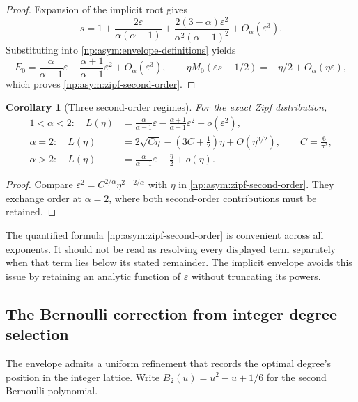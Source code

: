 \documentclass[11pt,a4paper]{article}
\newtheorem{corollary}[theorem]{Corollary}
\theoremstyle{definition}
\theoremstyle{remark}
\begin{document}
\begin{proof}
Expansion of the implicit root gives
\[
 s=1+\frac{2\varepsilon}{\alpha(\alpha-1)}
       +\frac{2(3-\alpha)\varepsilon^2}{\alpha^2(\alpha-1)^2}
       +O_\alpha(\varepsilon^3).
\]
Substituting into \eqref{np:asym:envelope-definitions} yields
\[
 E_0=\frac{\alpha}{\alpha-1}\varepsilon
          -\frac{\alpha+1}{\alpha-1}\varepsilon^2
          +O_\alpha(\varepsilon^3),
 \qquad
 \eta M_0(\varepsilon s-1/2)=-\eta/2+O_\alpha(\eta\varepsilon),
\]
which proves \eqref{np:asym:zipf-second-order}.
\end{proof}

\begin{corollary}[Three second-order regimes]
\label{np:asym:zipf-regimes}
For the exact Zipf distribution,
\begin{align*}
 1<\alpha<2:\quad
 L(\eta)&=\frac{\alpha}{\alpha-1}\varepsilon
           -\frac{\alpha+1}{\alpha-1}\varepsilon^2
           +o(\varepsilon^2),\\[1mm]
 \alpha=2:\quad
 L(\eta)&=2\sqrt{C\eta}-\left(3C+\frac12\right)\eta
                             +O(\eta^{3/2}),
                  \qquad C=\frac6{\pi^2},\\[1mm]
 \alpha>2:\quad
 L(\eta)&=\frac{\alpha}{\alpha-1}\varepsilon-\frac\eta2+o(\eta).
\end{align*}
\end{corollary}

\begin{proof}
Compare $\varepsilon^2=C^{2/\alpha}\eta^{2-2/\alpha}$ with $\eta$
in \eqref{np:asym:zipf-second-order}.  They exchange order at
$\alpha=2$, where both second-order contributions must be retained.
\end{proof}

The quantified formula \eqref{np:asym:zipf-second-order} is convenient
across all exponents.  It should not be read as resolving every displayed
term separately when that term lies below its stated remainder.
The implicit envelope avoids this issue by retaining an analytic function
of $\varepsilon$ without truncating its powers.

\subsection{The Bernoulli correction from integer degree selection}
\label{np:asym:lattice}

The envelope admits a uniform refinement that records the optimal degree's
position in the integer lattice.  Write $B_2(u)=u^2-u+1/6$ for the second
Bernoulli polynomial.
\end{document}
